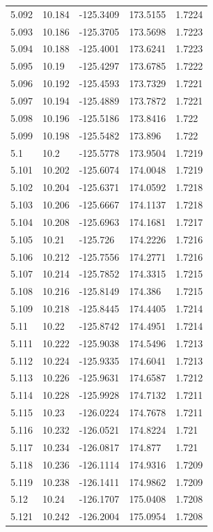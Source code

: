 \begin{tabular}{lllll}
5.092 & 10.184 & -125.3409 & 173.5155 & 1.7224 \\
5.093 & 10.186 & -125.3705 & 173.5698 & 1.7223 \\
5.094 & 10.188 & -125.4001 & 173.6241 & 1.7223 \\
5.095 & 10.19 & -125.4297 & 173.6785 & 1.7222 \\
5.096 & 10.192 & -125.4593 & 173.7329 & 1.7221 \\
5.097 & 10.194 & -125.4889 & 173.7872 & 1.7221 \\
5.098 & 10.196 & -125.5186 & 173.8416 & 1.722 \\
5.099 & 10.198 & -125.5482 & 173.896 & 1.722 \\
5.1 & 10.2 & -125.5778 & 173.9504 & 1.7219 \\
5.101 & 10.202 & -125.6074 & 174.0048 & 1.7219 \\
5.102 & 10.204 & -125.6371 & 174.0592 & 1.7218 \\
5.103 & 10.206 & -125.6667 & 174.1137 & 1.7218 \\
5.104 & 10.208 & -125.6963 & 174.1681 & 1.7217 \\
5.105 & 10.21 & -125.726 & 174.2226 & 1.7216 \\
5.106 & 10.212 & -125.7556 & 174.2771 & 1.7216 \\
5.107 & 10.214 & -125.7852 & 174.3315 & 1.7215 \\
5.108 & 10.216 & -125.8149 & 174.386 & 1.7215 \\
5.109 & 10.218 & -125.8445 & 174.4405 & 1.7214 \\
5.11 & 10.22 & -125.8742 & 174.4951 & 1.7214 \\
5.111 & 10.222 & -125.9038 & 174.5496 & 1.7213 \\
5.112 & 10.224 & -125.9335 & 174.6041 & 1.7213 \\
5.113 & 10.226 & -125.9631 & 174.6587 & 1.7212 \\
5.114 & 10.228 & -125.9928 & 174.7132 & 1.7211 \\
5.115 & 10.23 & -126.0224 & 174.7678 & 1.7211 \\
5.116 & 10.232 & -126.0521 & 174.8224 & 1.721 \\
5.117 & 10.234 & -126.0817 & 174.877 & 1.721 \\
5.118 & 10.236 & -126.1114 & 174.9316 & 1.7209 \\
5.119 & 10.238 & -126.1411 & 174.9862 & 1.7209 \\
5.12 & 10.24 & -126.1707 & 175.0408 & 1.7208 \\
5.121 & 10.242 & -126.2004 & 175.0954 & 1.7208 \\

\end{tabular}
